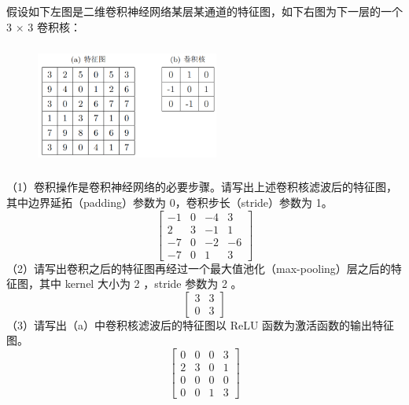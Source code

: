 \documentclass[UTF8]{ctexart}
\begin{document}
\subsection{}
假设如下左图是二维卷积神经网络某层某通道的特征图，如下右图为下一层的一个 3 × 3 卷积核：
\begin{figure}[H]
\centering
\includegraphics[width=6cm,height=4cm]{2017-2.png}
\end{figure}
（1）卷积操作是卷积神经网络的必要步骤。请写出上述卷积核滤波后的特征图，其中边界延拓（padding）参数为 0，卷积步长（stride）参数为 1。 
\begin{equation*}
\begin{bmatrix}
-1&0&-4&3\\
2&3&-1&1\\
-7&0&-2&-6\\
-7&0&1&3
\end{bmatrix}
\end{equation*}
（2）请写出卷积之后的特征图再经过一个最大值池化（max-pooling）层之后的特征图，其中 kernel 大小为 2 ，stride 参数为 2 。
\begin{equation*}
\begin{bmatrix}
3&3\\
0&3
\end{bmatrix}
\end{equation*} 
（3）请写出（a）中卷积核滤波后的特征图以 ReLU 函数为激活函数的输出特征图。
\begin{equation*}
\begin{bmatrix}
0&0&0&3\\
2&3&0&1\\
0&0&0&0\\
0&0&1&3
\end{bmatrix}
\end{equation*}
\end{document}
